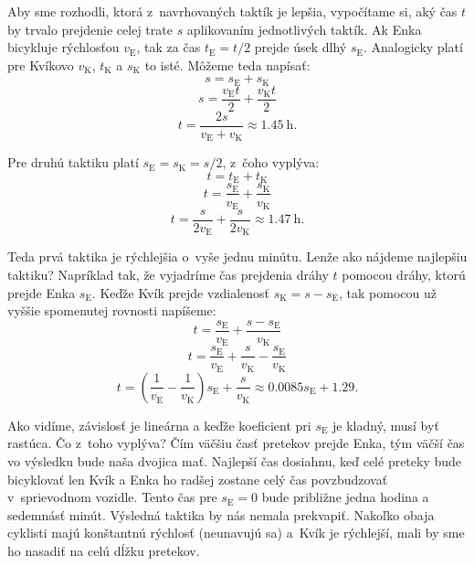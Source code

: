 Aby sme rozhodli, ktorá z~navrhovaných taktík je lepšia, vypočítame si, aký čas $t$ by trvalo prejdenie celej trate $s$ aplikovaním jednotlivých taktík.
Ak Enka bicykluje rýchlosťou $v_{\mathrm{E}}$, tak za čas $t_{\mathrm{E}} = t/2$ prejde úsek dlhý $s_{\mathrm{E}}$.
Analogicky platí pre Kvíkovo $v_{\mathrm{K}}$, $t_{\mathrm{K}}$ a $s_{\mathrm{K}}$ to isté. Môžeme teda napísať:
$$s=s_{\mathrm{E}} + s_{\mathrm{K}}$$
$$s=\frac{v_{\mathrm{E}} t}{2} + \frac{v_{\mathrm{K}} t}{2}$$
$$t=\frac{2s}{v_{\mathrm{E}} + v_{\mathrm{K}}} \approx \SI{1.45}{\hour} \text{.}$$

Pre druhú taktiku platí $s_{\mathrm{E}}=s_{\mathrm{K}}= s/2$, z~čoho vyplýva:
$$t=t_{\mathrm{E}}+t_{\mathrm{K}}$$
$$t=\frac{s_{\mathrm{E}}}{v_{\mathrm{E}}}+\frac{s_{\mathrm{K}}}{v_{\mathrm{K}}}$$
$$t=\frac{s}{2v_{\mathrm{E}}}+\frac{s}{2v_{\mathrm{K}}}  \approx \SI{1.47}{\hour} \text{.}$$

Teda prvá taktika je rýchlejšia o~vyše jednu minútu.
Lenže ako nájdeme najlepšiu taktiku? Napríklad tak, že vyjadríme čas prejdenia dráhy $t$ pomocou dráhy, ktorú prejde Enka $s_{\mathrm{E}}$.
Keďže Kvík prejde vzdialenosť $s_{\mathrm{K}}=s - s_{\mathrm{E}}$, tak pomocou už vyššie spomenutej rovnosti napíšeme:
$$t=\frac{s_{\mathrm{E}}}{v_{\mathrm{E}}}+\frac{s - s_{\mathrm{E}}}{v_{\mathrm{K}}}$$
$$t=\frac{s_{\mathrm{E}}}{v_{\mathrm{E}}}+\frac{s}{v_{\mathrm{K}}}-\frac{s_{\mathrm{E}}}{v_{\mathrm{K}}}$$
$$t=\left(\frac{1}{v_{\mathrm{E}}}-\frac{1}{v_{\mathrm{K}}}\right)s_{\mathrm{E}}+\frac{s}{v_{\mathrm{K}}} \approx 0.0085s_{\mathrm{E}}+1.29  \text{.}$$

Ako vidíme, závislosť je lineárna a keďže koeficient pri $s_{\mathrm{E}}$ je kladný, musí byť rastúca.
Čo z~toho vyplýva? Čím väčšiu časť pretekov prejde Enka, tým väčší čas vo výsledku bude naša dvojica mať.
Najlepší čas dosiahnu, keď celé preteky bude bicyklovať len Kvík a Enka ho radšej zostane celý čas povzbudzovať v~sprievodnom vozidle.
Tento čas pre $s_{\mathrm{E}}=0$ bude približne jedna hodina a sedemnásť minút.
Výsledná taktika by nás nemala prekvapiť. Nakoľko obaja cyklisti majú konštantnú rýchlosť (neunavujú sa) a~Kvík je rýchlejší, mali by sme ho nasadiť na celú dĺžku pretekov.
